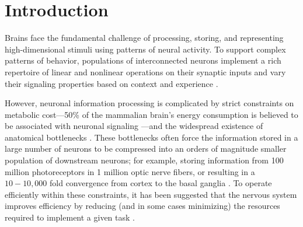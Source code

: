 \section*{Introduction}
\label{sec:introduction}
Brains face the fundamental challenge of 
processing, storing, and representing high-dimensional stimuli
using patterns of neural activity.
To support complex patterns of behavior, 
populations of interconnected neurons implement 
a rich repertoire of linear and nonlinear operations on their synaptic inputs
and vary their signaling properties based on context and experience
\cite{Koch1999}.

However, neuronal information processing is complicated
by strict constraints on metabolic cost---50\% of the 
mammalian brain's energy consumption is believed to be associated with 
neuronal signaling \cite{Laughlin2001, Lennie2003}---and the 
widespread existence of anatomical bottlenecks 
\cite{Kempermann2002,BarGad2003_Review,Babinsky1993}.
These bottlenecks often force the information
stored in a large number of neurons
to be compressed into an orders of magnitude smaller population
of downstream neurons;
for example, storing information from 100 million photoreceptors 
in 1 million optic nerve fibers,
or resulting in a $10 - 10,000$ fold convergence from cortex to the basal ganglia
\cite{BarGad2003_Review}.
To operate efficiently within these constraints,
it has been suggested that the nervous system improves 
efficiency by reducing (and in some cases minimizing) the resources
required to implement a given task \cite{LaughlinSejnowski2003}.

